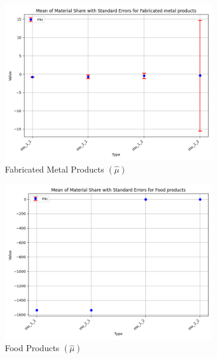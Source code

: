 \documentclass{article}
\begin{document}
\begin{figure}[ht!]
    \begin{subfigure}[t]{0.32\textwidth}
        \centering
        \includegraphics[width=\textwidth]{figure/empirical_ar1_mixture_kmshare_ciiu_mu_with_error_bars_Fabricated metal products.png}
        \caption{Fabricated Metal Products $(\hat\mu)$}
    \end{subfigure}
    \begin{subfigure}[t]{0.32\textwidth}
        \centering
        \includegraphics[width=\textwidth]{figure/empirical_ar1_mixture_kmshare_ciiu_mu_with_error_bars_Food products.png}
        \caption{Food Products $(\hat\mu)$}
    \end{subfigure}
    \begin{subfigure}[t]{0.32\textwidth}

\end{subfigure}
\end{figure}
\end{document}
